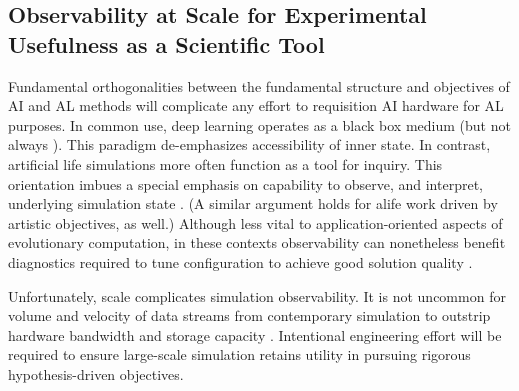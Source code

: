 
\subsection{Observability at Scale for Experimental Usefulness as a Scientific Tool}


Fundamental orthogonalities between the fundamental structure and objectives of AI and AL methods will complicate any effort to requisition AI hardware for AL purposes.
In common use, deep learning operates as a black box medium \citep{TODO} (but not always \citep{TODO}).
This paradigm de-emphasizes accessibility of inner state.
In contrast, artificial life simulations more often function as a tool for inquiry.
This orientation imbues a special emphasis on capability to observe, and interpret, underlying simulation state \citep{moreno2023toward,horgan1995complexity}.
(A similar argument holds for alife work driven by artistic objectives, as well.)
Although less vital to application-oriented aspects of evolutionary computation, in these contexts observability can nonetheless benefit diagnostics required to tune configuration to achieve good solution quality \citep{hernandez2022can}.

Unfortunately, scale complicates simulation observability.
It is not uncommon for volume and velocity of data streams from contemporary simulation to outstrip hardware bandwidth and storage capacity \citep{TODODOEDATAREDUCTIONPHAMPHLET}.
Intentional engineering effort will be required to ensure large-scale simulation retains utility in pursuing rigorous hypothesis-driven objectives.

